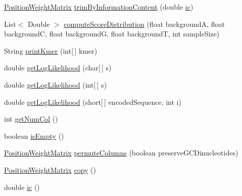 \begin{DoxyCompactItemize}
\item 
\hyperlink{classbroad_1_1core_1_1motif_1_1_position_weight_matrix}{Position\+Weight\+Matrix} \hyperlink{classbroad_1_1core_1_1motif_1_1_position_weight_matrix_aea292a2e74d006a0002b626ebc6c8732}{trim\+By\+Information\+Content} (double \hyperlink{classbroad_1_1core_1_1motif_1_1_position_weight_matrix_a19c2e267b3adebb5a9e1a0c29c8c2be4}{ic})
\item 
List$<$ Double $>$ \hyperlink{classbroad_1_1core_1_1motif_1_1_position_weight_matrix_a8dbc8707e7fd3c12d2264d80ecf20d36}{compute\+Score\+Distribution} (float background\+A, float background\+C, float background\+G, float background\+T, int sample\+Size)
\item 
String \hyperlink{classbroad_1_1core_1_1motif_1_1_position_weight_matrix_a75b281ac9f09c01684acecce3e27fad5}{print\+Kmer} (int\mbox{[}$\,$\mbox{]} kmer)
\item 
double \hyperlink{classbroad_1_1core_1_1motif_1_1_position_weight_matrix_a0fab2425599830972c542de9832541c2}{get\+Log\+Likelihood} (char\mbox{[}$\,$\mbox{]} s)
\item 
double \hyperlink{classbroad_1_1core_1_1motif_1_1_position_weight_matrix_aad374707533f2e09d28adb7b311d7800}{get\+Log\+Likelihood} (int\mbox{[}$\,$\mbox{]} s)
\item 
double \hyperlink{classbroad_1_1core_1_1motif_1_1_position_weight_matrix_a58cb3086adb212ddd79e3b3b4b595271}{get\+Log\+Likelihood} (short\mbox{[}$\,$\mbox{]} encoded\+Sequence, int i)
\item 
int \hyperlink{classbroad_1_1core_1_1motif_1_1_position_weight_matrix_a589b2f00b2f8f91f83aeb5852d941db3}{get\+Num\+Col} ()
\item 
boolean \hyperlink{classbroad_1_1core_1_1motif_1_1_position_weight_matrix_a4088289b8a3cd37348a5bfadb1f73677}{is\+Empty} ()
\item 
\hyperlink{classbroad_1_1core_1_1motif_1_1_position_weight_matrix}{Position\+Weight\+Matrix} \hyperlink{classbroad_1_1core_1_1motif_1_1_position_weight_matrix_a519dd909700982492e6996c840263157}{permute\+Columns} (boolean preserve\+G\+C\+Dinucleotides)
\item 
\hyperlink{classbroad_1_1core_1_1motif_1_1_position_weight_matrix}{Position\+Weight\+Matrix} \hyperlink{classbroad_1_1core_1_1motif_1_1_position_weight_matrix_a1793deced98122752214cacdfef0a1d4}{copy} ()
\item 
double \hyperlink{classbroad_1_1core_1_1motif_1_1_position_weight_matrix_a19c2e267b3adebb5a9e1a0c29c8c2be4}{ic} ()
\item 

\end{DoxyCompactItemize}
